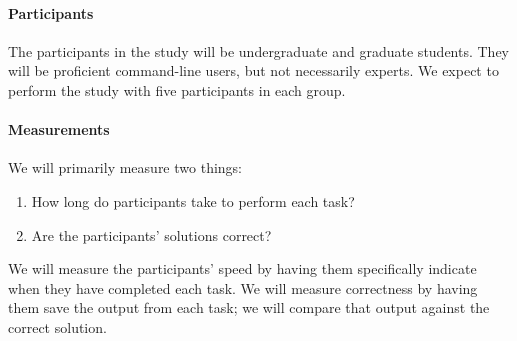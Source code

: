 \paragraph{Participants} The participants in the study will be undergraduate and
graduate students. They will be proficient command-line users, but not
necessarily experts. We expect to perform the study with five participants in
each group.

\paragraph{Measurements} We will primarily measure two things:
\begin{enumerate}\itemsep-1pt
    \item How long do participants take to perform each task?
    \item Are the participants' solutions correct?
\end{enumerate}
We will measure the participants' speed by having them specifically indicate
when they have completed each task. We will measure correctness by having them
save the output from each task; we will compare that output against the correct
solution.
